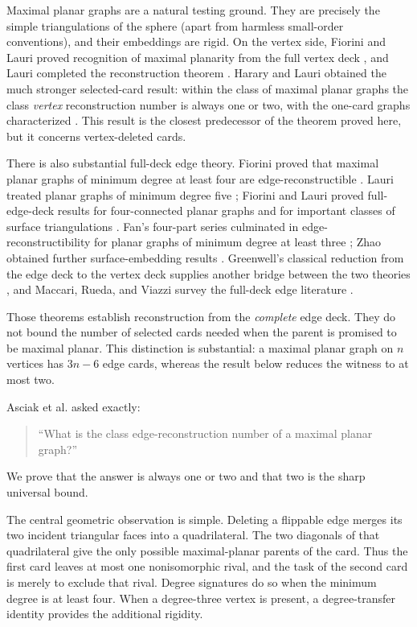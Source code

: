 \documentclass[11pt]{article}
\theoremstyle{definition}
\theoremstyle{remark}
\begin{document}
Maximal planar graphs are a natural testing ground.  They are precisely the
simple triangulations of the sphere (apart from harmless small-order
conventions), and their embeddings are rigid.  On the vertex side, Fiorini
and Lauri proved recognition of maximal planarity from the full vertex deck
\cite{FioriniLauri1981Recognition}, and Lauri completed the reconstruction
theorem \cite{Lauri1981Reconstruction}.  Harary and Lauri obtained the much
stronger selected-card result: within the class of maximal planar graphs the
class \emph{vertex} reconstruction number is always one or two, with the
one-card graphs characterized \cite{HararyLauri1987}.  This result is the
closest predecessor of the theorem proved here, but it concerns
vertex-deleted cards.

There is also substantial full-deck edge theory.  Fiorini proved that maximal
planar graphs of minimum degree at least four are edge-reconstructible
\cite{Fiorini1978Edge}.  Lauri treated planar graphs of minimum degree five
\cite{Lauri1979}; Fiorini and Lauri proved full-edge-deck results for
four-connected planar graphs \cite{FioriniLauri1982FourConnected} and for
important classes of surface triangulations
\cite{FioriniLauri1982Surfaces}.  Fan's four-part series culminated in
edge-reconstructibility for planar graphs of minimum degree at least three
\cite{FanSeriesI,FanSeriesII,FanSeriesIII,FanSeriesIV}; Zhao obtained further surface-embedding results
\cite{Zhao1993,Zhao1998II,Zhao1998III}.  Greenwell's classical reduction from
the edge deck to the vertex deck supplies another bridge between the two
theories \cite{Greenwell1971}, and Maccari, Rueda, and Viazzi survey the
full-deck edge literature \cite{MaccariEtAl2002}.

Those theorems establish reconstruction from the \emph{complete} edge deck.
They do not bound the number of selected cards needed when the parent is
promised to be maximal planar.  This distinction is substantial: a maximal
planar graph on \(n\) vertices has \(3n-6\) edge cards, whereas the result
below reduces the witness to at most two.

Asciak et al. asked exactly:
\begin{quote}
``What is the class edge-reconstruction number of a maximal planar graph?''
\cite[Problem~2.5]{AsciakEtAl2010}
\end{quote}
We prove that the answer is always one or two and that two is the sharp
universal bound.

The central geometric observation is simple.  Deleting a flippable edge
merges its two incident triangular faces into a quadrilateral.  The two
diagonals of that quadrilateral give the only possible maximal-planar parents
of the card.  Thus the first card leaves at most one nonisomorphic rival, and
the task of the second card is merely to exclude that rival.  Degree
signatures do so when the minimum degree is at least four.  When a
degree-three vertex is present, a degree-transfer identity provides the
additional rigidity.
\end{document}

